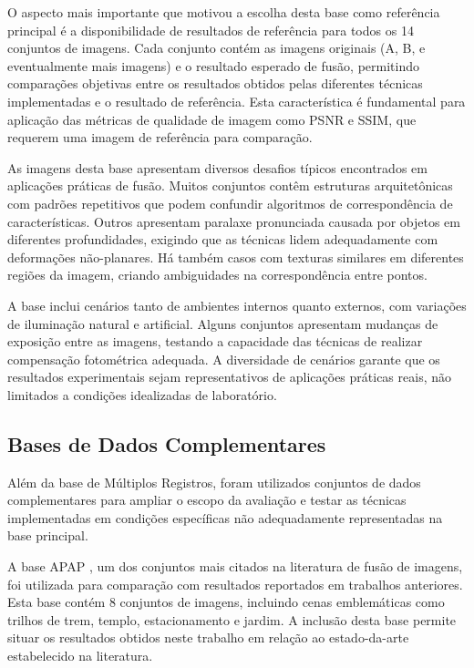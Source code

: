 O aspecto mais importante que motivou a escolha desta base como referência principal é a disponibilidade de resultados de referência para todos os 14 conjuntos de imagens. Cada conjunto contém as imagens originais (A, B, e eventualmente mais imagens) e o resultado esperado de fusão, permitindo comparações objetivas entre os resultados obtidos pelas diferentes técnicas implementadas e o resultado de referência. Esta característica é fundamental para aplicação das métricas de qualidade de imagem como PSNR e SSIM, que requerem uma imagem de referência para comparação.

As imagens desta base apresentam diversos desafios típicos encontrados em aplicações práticas de fusão. Muitos conjuntos contêm estruturas arquitetônicas com padrões repetitivos que podem confundir algoritmos de correspondência de características. Outros apresentam paralaxe pronunciada causada por objetos em diferentes profundidades, exigindo que as técnicas lidem adequadamente com deformações não-planares. Há também casos com texturas similares em diferentes regiões da imagem, criando ambiguidades na correspondência entre pontos.

A base inclui cenários tanto de ambientes internos quanto externos, com variações de iluminação natural e artificial. Alguns conjuntos apresentam mudanças de exposição entre as imagens, testando a capacidade das técnicas de realizar compensação fotométrica adequada. A diversidade de cenários garante que os resultados experimentais sejam representativos de aplicações práticas reais, não limitados a condições idealizadas de laboratório.

\subsection{Bases de Dados Complementares}

Além da base de Múltiplos Registros, foram utilizados conjuntos de dados complementares para ampliar o escopo da avaliação e testar as técnicas implementadas em condições específicas não adequadamente representadas na base principal.

A base APAP \cite{zaragoza2013projective}, um dos conjuntos mais citados na literatura de fusão de imagens, foi utilizada para comparação com resultados reportados em trabalhos anteriores. Esta base contém 8 conjuntos de imagens, incluindo cenas emblemáticas como trilhos de trem, templo, estacionamento e jardim. A inclusão desta base permite situar os resultados obtidos neste trabalho em relação ao estado-da-arte estabelecido na literatura.

